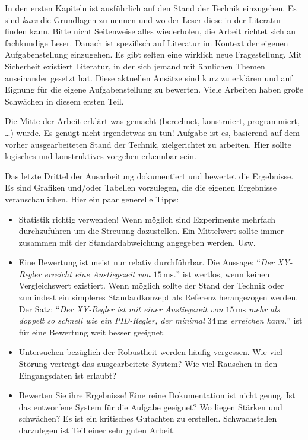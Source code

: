 In den ersten Kapiteln ist ausführlich auf den Stand der Technik einzugehen. Es sind \emph{kurz} die Grundlagen zu nennen und wo der Leser diese in der Literatur finden kann. Bitte nicht Seitenweise alles wiederholen, die Arbeit richtet sich an fachkundige Leser. Danach ist spezifisch auf Literatur im Kontext der eigenen Aufgabenstellung einzugehen. Es gibt selten eine wirklich neue Fragestellung. Mit Sicherheit existiert Literatur, in der sich jemand mit ähnlichen Themen auseinander gesetzt hat. Diese aktuellen Ansätze sind kurz zu erklären und auf Eignung für die eigene Aufgabenstellung zu bewerten. Viele Arbeiten haben große Schwächen in diesem ersten Teil.

Die Mitte der Arbeit erklärt was gemacht (berechnet, konstruiert, programmiert, \ldots) wurde. Es genügt nicht irgendetwas zu tun! Aufgabe ist es, basierend auf dem vorher ausgearbeiteten Stand der Technik, zielgerichtet zu arbeiten. Hier sollte logisches und konstruktives vorgehen erkennbar sein.

Das letzte Drittel der Ausarbeitung dokumentiert und bewertet die Ergebnisse. Es sind Grafiken und/oder Tabellen vorzulegen, die die eigenen Ergebnisse veranschaulichen. Hier ein paar generelle Tipps:

\begin{itemize}
	\item Statistik richtig verwenden! Wenn möglich sind Experimente mehrfach durchzuführen um die Streuung dazustellen. Ein Mittelwert sollte immer zusammen mit der Standardabweichung angegeben werden. Usw.
	\item Eine Bewertung ist meist nur relativ durchführbar. Die Aussage: "`\emph{Der XY-Regler erreicht eine Anstiegszeit von $15\,\mathrm{ms}$.}"' ist wertlos, wenn keinen Vergleichswert existiert. Wenn möglich sollte der Stand der Technik oder zumindest ein simpleres Standardkonzept als Referenz herangezogen werden. Der Satz: "`\emph{Der XY-Regler ist mit einer Anstiegszeit von $15\,\mathrm{ms}$ mehr als doppelt so schnell wie ein PID-Regler, der minimal $34\,\mathrm{ms}$ erreichen kann.}"' ist für eine Bewertung weit besser geeignet.
	\item Untersuchen bezüglich der Robustheit werden häufig vergessen. Wie viel Störung verträgt das ausgearbeitete System? Wie viel Rauschen in den Eingangsdaten ist erlaubt?
	\item Bewerten Sie ihre Ergebnisse! Eine reine Dokumentation ist nicht genug. Ist das entworfene System für die Aufgabe geeignet? Wo liegen Stärken und schwächen? Es ist ein kritisches Gutachten zu erstellen. Schwachstellen darzulegen ist Teil einer sehr guten Arbeit. 
\end{itemize}

